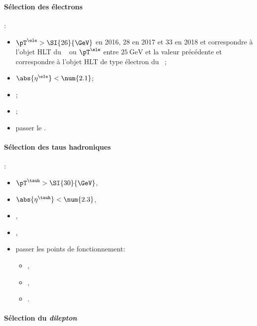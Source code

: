 \paragraph{Sélection des électrons}
:
\begin{itemize}
    \item $\pT^{\ele} > \SI{26}{\GeV}$ en 2016, \num{28} en 2017 et \num{33} en 2018 et correspondre à l'objet HLT du \HLTpath\ \HLTSingleEle{} ou $\pT^{\ele}$ entre $\SI{25}{\GeV}$ et la valeur précédente et correspondre à l'objet HLT de type électron du \HLTpath\ \HLTEleTauCross{};
    \item $\abs{\eta^{\ele}} < \num{2.1}$;
    \item \Leptondzdxy;
    \item {};
    \item passer le \NinetyNineEleMVA.
\end{itemize}
\paragraph{Sélection des taus hadroniques}
:
\begin{itemize}
    \item $\pT^{\tauh} > \SI{30}{\GeV}$,
    \item $\abs{\eta^{\tauh}} < \num{2.3}$,
    \item \TauHdz,
    \item \NewDecayModeFinding,
    \item passer les points de fonctionnement:
        \begin{itemize}
            \item {},
            \item {},
            \item {}.
        \end{itemize}
\end{itemize}
\paragraph{Sélection du \emph{dilepton}}
\AtLeastOneOSPair{\ele\tauh}
\IfMoreOnePair
